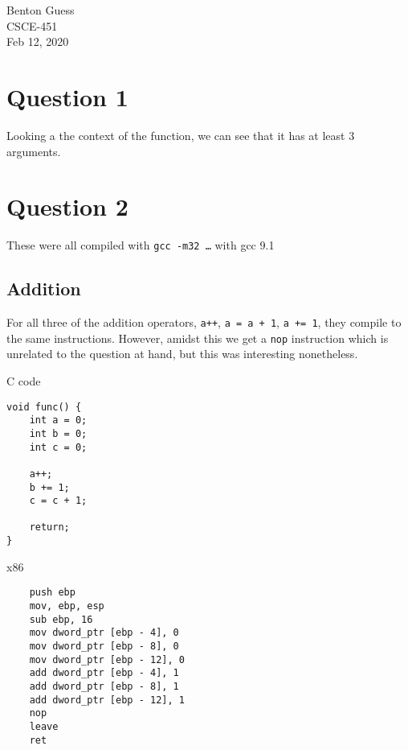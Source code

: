 \documentclass[11pt]{article}
\begin{document}
    \begin{flushright}
        Benton Guess \\
        CSCE-451 \\
        Feb 12, 2020 \\
    \end{flushright}
\RaggedRight

\section*{Question 1}
Looking a the context of the function, we can see that it has at least 3 arguments.

\section*{Question 2}
These were all compiled with \texttt{gcc -m32 \dots} with gcc 9.1\\

\subsection*{Addition}

For all three of the addition operators, \texttt{a++}, \texttt{a = a + 1}, \texttt{a += 1}, they compile to the same instructions. However, amidst this we get a \texttt{nop} instruction which is unrelated to the question at hand, but this was interesting nonetheless.

C code
\begin{lstlisting}
void func() {
    int a = 0;
    int b = 0;
    int c = 0;

    a++;
    b += 1;
    c = c + 1;
    
    return;
}
\end{lstlisting}

x86
\begin{lstlisting}
    push ebp
    mov, ebp, esp
    sub ebp, 16
    mov dword_ptr [ebp - 4], 0
    mov dword_ptr [ebp - 8], 0
    mov dword_ptr [ebp - 12], 0
    add dword_ptr [ebp - 4], 1
    add dword_ptr [ebp - 8], 1
    add dword_ptr [ebp - 12], 1
    nop
    leave 
    ret
\end{lstlisting}
\end{document}
